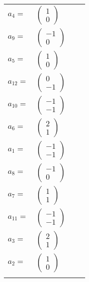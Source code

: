 \documentclass[1p]{elsarticle_modified}
\theoremstyle{definition}
\begin{document}
\begin{tabular}{m{7pt} m{180pt} m{7pt} m{180pt} }
\flushright $a_{4}=$&$\begin{pmatrix}1\\0\end{pmatrix}$ \\
\flushright $a_{9}=$&$\begin{pmatrix}-1\\0\end{pmatrix}$ \\
\flushright $a_{5}=$&$\begin{pmatrix}1\\0\end{pmatrix}$ \\
\flushright $a_{12}=$&$\begin{pmatrix}0\\-1\end{pmatrix}$ \\
\flushright $a_{10}=$&$\begin{pmatrix}-1\\-1\end{pmatrix}$ \\
\flushright $a_{6}=$&$\begin{pmatrix}2\\1\end{pmatrix}$ \\
\flushright $a_{1}=$&$\begin{pmatrix}-1\\-1\end{pmatrix}$ \\
\flushright $a_{8}=$&$\begin{pmatrix}-1\\0\end{pmatrix}$ \\
\flushright $a_{7}=$&$\begin{pmatrix}1\\1\end{pmatrix}$ \\
\flushright $a_{11}=$&$\begin{pmatrix}-1\\-1\end{pmatrix}$ \\
\flushright $a_{3}=$&$\begin{pmatrix}2\\1\end{pmatrix}$ \\
\flushright $a_{2}=$&$\begin{pmatrix}1\\0\end{pmatrix}$\\&\end{tabular}
\end{document}
